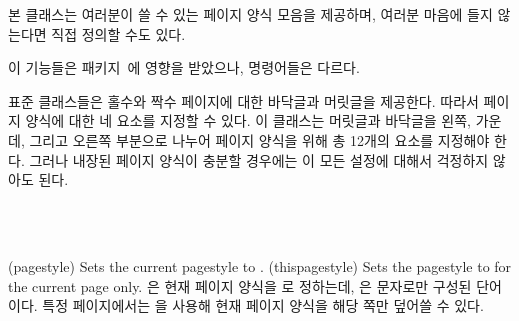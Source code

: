 
본 클래스는 여러분이 쓸 수 있는 페이지 양식 모음을 제공하며, 여러분 마음에 들지
않는다면 직접 정의할 수도 있다.

이 기능들은  패키지~\cite{FANCYHDR}에 영향을 받았으나,
명령어들은 다르다.

표준 클래스들은 홀수와 짝수 페이지에 대한 바닥글과
머릿글을 제공한다.
따라서 페이지 양식에 대한 네 요소를 지정할 수 있다.
이 클래스는 머릿글과 바닥글을 왼쪽,
가운데, 그리고 오른쪽 부분으로 나누어 페이지 양식을 위해 총 12개의 요소를
지정해야 한다.
그러나 내장된 페이지 양식이 충분할 경우에는 이 모든 설정에 대해서 걱정하지
않아도 된다.

\begin{syntax}
\cmd{\pagestyle} \\
\cmd{\thispagestyle} \\
\end{syntax}
\glossary(pagestyle)%
  {}%
  {Sets the current pagestyle to .}
\glossary(thispagestyle)%
  {}%
  {Sets the pagestyle to  for the current page only.}
\cmd{\pagestyle}은 현재 페이지 양식을 로 정하는데, 은
문자로만 구성된 단어이다.
특정 페이지에서는 \cmd{\thispagestyle}을 사용해 현재 페이지 양식을 해당 쪽만
덮어쓸 수 있다.

